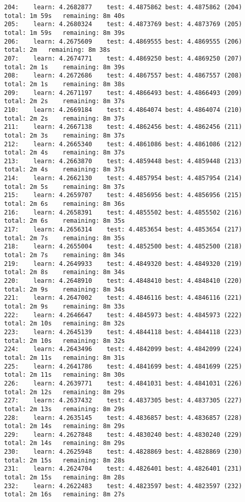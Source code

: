 \documentclass[11pt]{article}
\begin{document}
\begin{Verbatim}[commandchars=\\\{\}]
204:	learn: 4.2682877	test: 4.4875862	best: 4.4875862 (204)	total: 1m 59s	remaining: 8m 40s
205:	learn: 4.2680324	test: 4.4873769	best: 4.4873769 (205)	total: 1m 59s	remaining: 8m 39s
206:	learn: 4.2675609	test: 4.4869555	best: 4.4869555 (206)	total: 2m	remaining: 8m 38s
207:	learn: 4.2674771	test: 4.4869250	best: 4.4869250 (207)	total: 2m 1s	remaining: 8m 39s
208:	learn: 4.2672686	test: 4.4867557	best: 4.4867557 (208)	total: 2m 1s	remaining: 8m 38s
209:	learn: 4.2671197	test: 4.4866493	best: 4.4866493 (209)	total: 2m 2s	remaining: 8m 37s
210:	learn: 4.2669184	test: 4.4864074	best: 4.4864074 (210)	total: 2m 2s	remaining: 8m 37s
211:	learn: 4.2667138	test: 4.4862456	best: 4.4862456 (211)	total: 2m 3s	remaining: 8m 37s
212:	learn: 4.2665340	test: 4.4861086	best: 4.4861086 (212)	total: 2m 4s	remaining: 8m 37s
213:	learn: 4.2663870	test: 4.4859448	best: 4.4859448 (213)	total: 2m 4s	remaining: 8m 37s
214:	learn: 4.2662130	test: 4.4857954	best: 4.4857954 (214)	total: 2m 5s	remaining: 8m 37s
215:	learn: 4.2659707	test: 4.4856956	best: 4.4856956 (215)	total: 2m 6s	remaining: 8m 36s
216:	learn: 4.2658391	test: 4.4855502	best: 4.4855502 (216)	total: 2m 6s	remaining: 8m 35s
217:	learn: 4.2656314	test: 4.4853654	best: 4.4853654 (217)	total: 2m 7s	remaining: 8m 35s
218:	learn: 4.2655004	test: 4.4852500	best: 4.4852500 (218)	total: 2m 7s	remaining: 8m 34s
219:	learn: 4.2649933	test: 4.4849320	best: 4.4849320 (219)	total: 2m 8s	remaining: 8m 34s
220:	learn: 4.2648910	test: 4.4848410	best: 4.4848410 (220)	total: 2m 9s	remaining: 8m 34s
221:	learn: 4.2647002	test: 4.4846116	best: 4.4846116 (221)	total: 2m 9s	remaining: 8m 33s
222:	learn: 4.2646647	test: 4.4845973	best: 4.4845973 (222)	total: 2m 10s	remaining: 8m 32s
223:	learn: 4.2645139	test: 4.4844118	best: 4.4844118 (223)	total: 2m 10s	remaining: 8m 32s
224:	learn: 4.2643496	test: 4.4842099	best: 4.4842099 (224)	total: 2m 11s	remaining: 8m 31s
225:	learn: 4.2641786	test: 4.4841699	best: 4.4841699 (225)	total: 2m 11s	remaining: 8m 30s
226:	learn: 4.2639771	test: 4.4841031	best: 4.4841031 (226)	total: 2m 12s	remaining: 8m 29s
227:	learn: 4.2637432	test: 4.4837305	best: 4.4837305 (227)	total: 2m 13s	remaining: 8m 29s
228:	learn: 4.2635145	test: 4.4836857	best: 4.4836857 (228)	total: 2m 14s	remaining: 8m 29s
229:	learn: 4.2627848	test: 4.4830240	best: 4.4830240 (229)	total: 2m 14s	remaining: 8m 29s
230:	learn: 4.2625948	test: 4.4828869	best: 4.4828869 (230)	total: 2m 15s	remaining: 8m 28s
231:	learn: 4.2624704	test: 4.4826401	best: 4.4826401 (231)	total: 2m 15s	remaining: 8m 28s
232:	learn: 4.2622483	test: 4.4823597	best: 4.4823597 (232)	total: 2m 16s	remaining: 8m 27s

\end{Verbatim}
\end{document}
